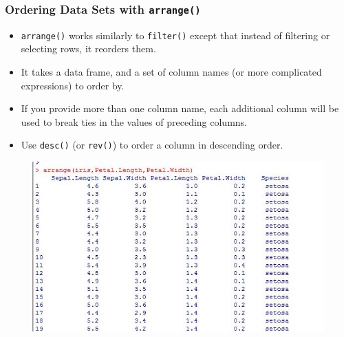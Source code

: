\documentclass{beamer}
\begin{document}
\begin{frame}
	\frametitle{Ordering Data Sets with \texttt{arrange()}}
	\Large
	\begin{itemize}
		\item \texttt{arrange()} works similarly to \texttt{filter()} except that instead of filtering or selecting rows, it reorders them. 
		
		\item It takes a data frame, and a set of column names (or more complicated expressions) to order by.
		
		\item If you provide more than one column name, each additional column will be used to break ties in the values of preceding columns.
		
		\item Use \texttt{desc()} (or \texttt{rev()}) to order a column in descending order.
		
	\end{itemize}
\end{frame}
\begin{frame}
	\begin{figure}
		\centering
		\includegraphics[width=0.97\linewidth]{images/irisarrange}
		
	\end{figure}
	
\end{frame}

\end{document}
